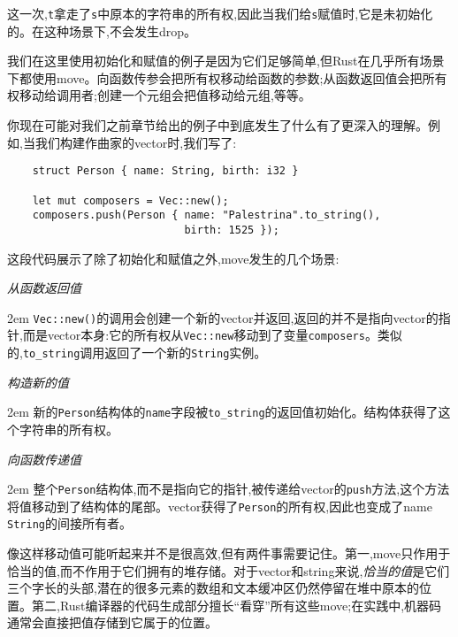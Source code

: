 这一次,\texttt{t}拿走了\texttt{s}中原本的字符串的所有权,因此当我们给\texttt{s}赋值时,它是未初始化的。在这种场景下,不会发生drop。

我们在这里使用初始化和赋值的例子是因为它们足够简单,但Rust在几乎所有场景下都使用move。向函数传参会把所有权移动给函数的参数;从函数返回值会把所有权移动给调用者;创建一个元组会把值移动给元组,等等。

你现在可能对我们之前章节给出的例子中到底发生了什么有了更深入的理解。例如,当我们构建作曲家的vector时,我们写了:
\begin{verbatim}
    struct Person { name: String, birth: i32 }

    let mut composers = Vec::new();
    composers.push(Person { name: "Palestrina".to_string(), 
                            birth: 1525 });
\end{verbatim}

这段代码展示了除了初始化和赋值之外,move发生的几个场景:
\begin{flushleft}
    \emph{从函数返回值}
\end{flushleft}

\hangindent 2em
\noindent
\texttt{Vec::new()}的调用会创建一个新的vector并返回,返回的并不是指向vector的指针,而是vector本身:它的所有权从\texttt{Vec::new}移动到了变量\texttt{composers}。类似的,\texttt{to\_string}调用返回了一个新的\texttt{String}实例。

\begin{flushleft}
    \emph{构造新的值}
\end{flushleft}

\hangindent 2em
\noindent
新的\texttt{Person}结构体的\texttt{name}字段被\texttt{to\_string}的返回值初始化。结构体获得了这个字符串的所有权。

\begin{flushleft}
    \emph{向函数传递值}
\end{flushleft}

\hangindent 2em
\noindent
整个\texttt{Person}结构体,而不是指向它的指针,被传递给vector的\texttt{push}方法,这个方法将值移动到了结构体的尾部。vector获得了\texttt{Person}的所有权,因此也变成了name \texttt{String}的间接所有者。

像这样移动值可能听起来并不是很高效,但有两件事需要记住。第一,move只作用于恰当的值,而不作用于它们拥有的堆存储。对于vector和string来说,\emph{恰当的值}是它们三个字长的头部,潜在的很多元素的数组和文本缓冲区仍然停留在堆中原本的位置。第二,Rust编译器的代码生成部分擅长“看穿”所有这些move;在实践中,机器码通常会直接把值存储到它属于的位置。

